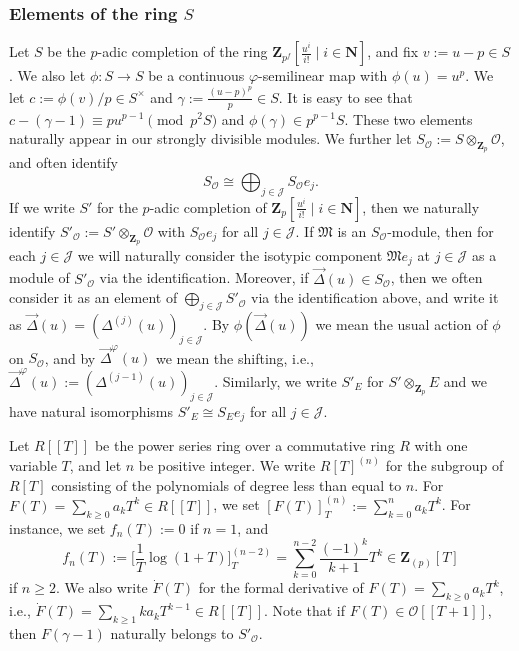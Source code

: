 \documentclass[11pt]{amsart}
\theoremstyle{definition}
\numberwithin{equation}{subsection}
\theoremstyle{plain}
\theoremstyle{plain}
\theoremstyle{plain}
\theoremstyle{plain}
\theoremstyle{plain}
\theoremstyle{plain}
\theoremstyle{plain}
\theoremstyle{plain}
\theoremstyle{plain}
\theoremstyle{plain}
\theoremstyle{plain}
\theoremstyle{plain}
\theoremstyle{definition}
\theoremstyle{definition}
\theoremstyle{definition}
\theoremstyle{remark}
\renewcommand{\(}{\textup{(}}
\renewcommand{\)}{\textup{)}}
\newcommand{\N}{\mathbf{N}}
\newcommand{\Z}{\mathbf{Z}}
\newcommand{\fM}{\mathfrak{M}}
\newcommand{\cO}{\mathcal{O}}
\newcommand{\cJ}{\mathcal{J}}
\newcommand{\vDel}{\vec{\Delta}}
\begin{document}
\subsubsection{Elements of the ring $S$}
Let $S$ be the $p$-adic completion of the ring $\Z_{p^f}[\frac{u^i}{i!}\mid i\in\N]$, and fix $v:=u-p\in S$. We also let $\phi:S\rightarrow S$ be a continuous $\varphi$-semilinear map with $\phi(u)=u^{p}$. We let $c:=\phi(v)/p\in S^\times$ and $\gamma:=\frac{(u-p)^p}{p}\in S$. It is easy to see that $c-(\gamma-1)\equiv pu^{p-1}\pmod{p^2S}$ and $\phi(\gamma)\in p^{p-1}S$. These two elements naturally appear in our strongly divisible modules. We further let $S_\cO:=S\otimes_{\Z_p}\cO$, and often identify $$S_\cO\cong\bigoplus_{j\in\cJ}S_{\cO} e_j.$$
If we write $S'$ for the $p$-adic completion of $\Z_p[\frac{u^i}{i!}\mid i\in\N]$, then we naturally identify $S'_\cO:=S'\otimes_{\Z_p}\cO$ with $S_\cO e_j$ for all $j\in\cJ$. If $\fM$ is an $S_\cO$-module, then for each $j\in\cJ$ we will naturally consider the isotypic component $\fM e_j$ at $j\in\cJ$ as a module of $S'_\cO$ via the identification. Moreover, if $\vDel(u)\in S_\cO$, then we often consider it as an element of $\bigoplus_{j\in\cJ}S'_{\cO}$ via the identification above, and write it as $\vDel(u)=(\Delta^{(j)}(u))_{j\in\cJ}$. By $\phi(\vDel(u))$ we mean the usual action of $\phi$ on $S_\cO$, and by $\vDel^\varphi(u)$ we mean the shifting, i.e., $\vDel^\varphi(u):=(\Delta^{(j-1)}(u))_{j\in\cJ}$. Similarly, we write $S'_E$ for $S'\otimes_{\Z_p}E$ and we have natural isomorphisms $S'_E\cong S_Ee_j$ for all $j\in\cJ$.

Let $R[[T]]$ be the power series ring over a commutative ring $R$ with one variable $T$, and let $n$ be positive integer. We write $R[T]^{(n)}$ for the subgroup of $R[T]$ consisting of the polynomials of degree less than equal to $n$. For $F(T)=\sum_{k\geq0}a_kT^k\in R[[T]]$, we set $[F(T)]_T^{(n)}:=\sum_{k=0}^{n}a_kT^k$. For instance, we set $f_n(T):=0$ if $n=1$, and
    \begin{equation}\label{eq: definition of f_r}
    f_{n}(T):=\bigg[\frac{1}{T}\log(1+T)\bigg]_{T}^{(n-2)}=\sum_{k=0}^{n-2}\frac{(-1)^k}{k+1}T^k\in\Z_{(p)}[T]
    \end{equation}
if $n\geq 2$. We also write $\dot{F}(T)$ for the formal derivative of $F(T)=\sum_{k\geq0}a_kT^k$, i.e., $\dot{F}(T)=\sum_{k\geq 1}ka_kT^{k-1}\in R[[T]]$. Note that if $F(T)\in\cO[[T+1]]$, then $F(\gamma-1)$ naturally belongs to $S'_\cO$.
\end{document}
